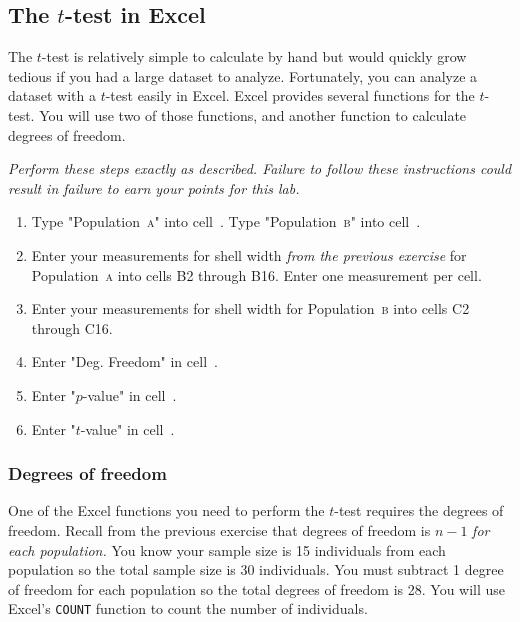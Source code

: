 \documentclass[12pt]{exam}
\newcommand*\Popa{Population~\textsc{a}}
\newcommand*\Popb{Population~\textsc{b}}
\newcommand*\xcell[1]{cell~\liningnum{#1}}
\begin{document}
\subsection*{The $t$-test in Excel}

The $t$-test is relatively simple to calculate by hand but would quickly grow tedious if you had a large dataset to analyze. Fortunately, you can analyze a dataset with a $t$-test easily in Excel. Excel provides several functions for the $t$-test. You will use two of those functions, and another function to calculate degrees of freedom.

\emph{Perform these steps exactly as described. Failure to follow these instructions could result in failure to earn your points for this lab.} 

\begin{enumerate}
	\item Type "\Popa" into \xcell{B1}. Type "\Popb" into \xcell{C1}.

	\item Enter your measurements for shell width \emph{from the previous exercise} for \Popa{} into cells {\liningnum B2 through B16}. Enter one measurement per cell.
	
	\item Enter your measurements for shell width for \Popb{} into cells {\liningnum C2 through C16}.
	
	\item Enter "Deg. Freedom" in \xcell{A18}.
	
	\item Enter "$p$-value" in \xcell{A19}.
	
	\item Enter "$t$-value" in \xcell{A20}.
	 
\end{enumerate}

\subsubsection*{Degrees of freedom}

One of the Excel functions you need to perform the $t$-test requires the degrees of freedom. Recall from the previous exercise that degrees of freedom is $n-1$ \emph{for each population.} You know your sample size is 15 individuals from each population so the total sample size is 30 individuals. You must subtract 1 degree of freedom for each population so the total degrees of freedom is 28. You will use Excel's \texttt{COUNT{}} function to count the number of individuals.
\end{document}
